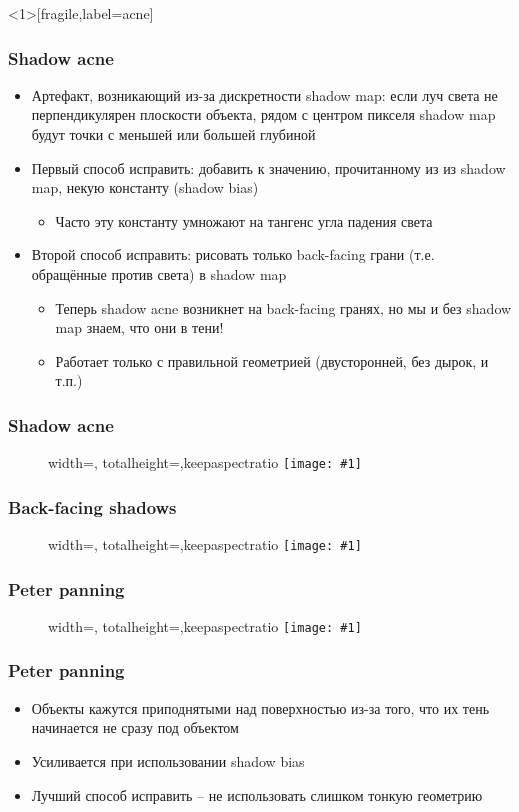 \documentclass{beamer}
\newcommand{\slideimage}[1]{
  \begin{figure}
    \begin{adjustbox}{width=\textwidth, totalheight=\textheight-2\baselineskip-2\baselineskip,keepaspectratio}
      \texttt{[image: \#1]}
    \end{adjustbox}
  \end{figure}
}
\begin{document}
\begin{frame}<1>[fragile,label=acne]
\frametitle{Shadow acne}
\begin{itemize}
\item Артефакт, возникающий из-за дискретности shadow map: если луч света не перпендикулярен плоскости объекта, рядом с центром пикселя shadow map будут точки с меньшей или большей глубиной
\pause
\item Первый способ исправить: добавить к значению, прочитанному из из shadow map, некую константу (shadow bias)
\begin{itemize}
\item Часто эту константу умножают на тангенс угла падения света
\end{itemize}
\pause
\item Второй способ исправить: рисовать только back-facing грани (т.е. обращённые против света) в shadow map
\begin{itemize}
\item Теперь shadow acne возникнет на back-facing гранях, но мы и без shadow map знаем, что они в тени!
\item Работает только с правильной геометрией (двусторонней, без дырок, и т.п.)
\end{itemize}
\end{itemize}
\end{frame}

\begin{frame}[fragile]
\frametitle{Shadow acne}
\slideimage{shadow-acne-scheme.png}
\end{frame}


\begin{frame}[fragile]
\frametitle{Back-facing shadows}
\slideimage{shadow-mapping-backface.png}
\end{frame}

\begin{frame}[fragile]
\frametitle{Peter panning}
\slideimage{peter-panning.png}
\end{frame}

\begin{frame}[fragile]
\frametitle{Peter panning}
\begin{itemize}
\item Объекты кажутся приподнятыми над поверхностью из-за того, что их тень начинается не сразу под объектом
\pause
\item Усиливается при использовании shadow bias
\pause
\item Лучший способ исправить -- не использовать слишком тонкую геометрию
\end{itemize}
\end{frame}
\end{document}
